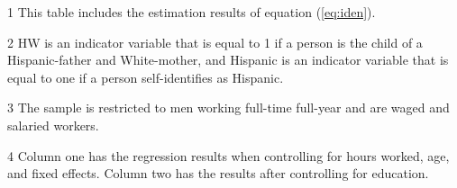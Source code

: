 \begin{table}[H]
{\begin{threeparttable}
\begin{tablenotes}
\item[1] \footnotesize{This table includes the estimation results of equation (\ref{eq:iden}).}
\item[2] \footnotesize{HW is an indicator variable that is equal to 1 if a person is the child of a Hispanic-father and White-mother, and Hispanic is an indicator variable that is equal to one if a person self-identifies as Hispanic.}
\item[3] \footnotesize{The sample is restricted to men working full-time full-year and are waged and salaried workers.}
\item[4] \footnotesize{Column one has the regression results when controlling for hours worked, age, and fixed effects. Column two has the results after controlling for education.}
\end{tablenotes}
\end{threeparttable}}
\end{table}
